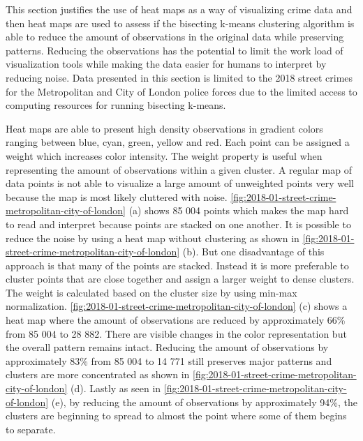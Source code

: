 \documentclass[main.tex]{subfiles}
\begin{document}
This section justifies the use of heat maps as a way of visualizing crime data and then heat maps are used to assess if the bisecting k-means clustering algorithm is able to reduce the amount of observations in the original data while preserving patterns. Reducing the observations has the potential to limit the work load of visualization tools while making the data easier for humans to interpret by reducing noise. Data presented in this section is limited to the 2018 street crimes for the Metropolitan and City of London police forces due to the limited access to computing resources for running bisecting k-means.

Heat maps are able to present high density observations in gradient colors ranging between blue, cyan, green, yellow and red. Each point can be assigned a weight which increases color intensity. The weight property is useful when representing the amount of observations within a given cluster. A regular map of data points is not able to visualize a large amount of unweighted points very well because the map is most likely cluttered with noise. \autoref{fig:2018-01-street-crime-metropolitan-city-of-london} (a) shows 85 004 points which makes the map hard to read and interpret because points are stacked on one another. It is possible to reduce the noise by using a heat map without clustering as shown in \autoref{fig:2018-01-street-crime-metropolitan-city-of-london} (b). But one disadvantage of this approach is that many of the points are stacked. Instead it is more preferable to cluster points that are close together and assign a larger weight to dense clusters. The weight is calculated based on the cluster size by using min-max normalization. \autoref{fig:2018-01-street-crime-metropolitan-city-of-london} (c) shows a heat map where the amount of observations are reduced by approximately 66\% from 85 004 to 28 882. There are visible changes in the color representation but the overall pattern remains intact. Reducing the amount of observations by approximately 83\% from 85 004 to 14 771 still preserves major patterns and clusters are more concentrated as shown in \autoref{fig:2018-01-street-crime-metropolitan-city-of-london} (d). Lastly as seen in \autoref{fig:2018-01-street-crime-metropolitan-city-of-london} (e), by reducing the amount of observations by approximately 94\%, the clusters are beginning to spread to almost the point where some of them begins to separate.
\end{document}
